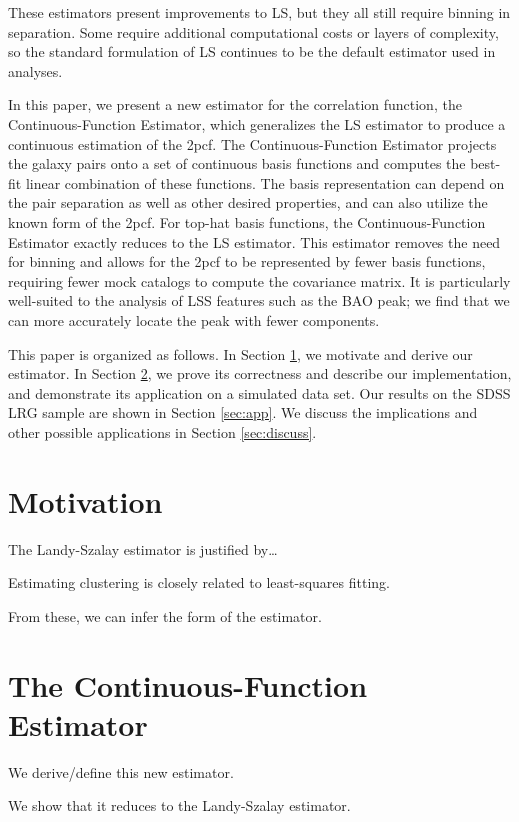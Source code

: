 \documentclass[twocolumn]{aastex62}
\newcommand{\cf}{2pcf\xspace} %
\newcommand{\Est}{The Continuous-Function Estimator\xspace}
\newcommand{\est}{the Continuous-Function Estimator\xspace}
\begin{document}
These estimators present improvements to LS, but they all still require binning in separation.
Some require additional computational costs or layers of complexity, so the standard formulation of LS continues to be the default estimator used in analyses.

In this paper, we present a new estimator for the correlation function, \est, which generalizes the LS estimator to produce a continuous estimation of the \cf. 
\Est projects the galaxy pairs onto a set of continuous basis functions and computes the best-fit linear combination of these functions.
The basis representation can depend on the pair separation as well as other desired properties, and can also utilize the known form of the \cf.
For top-hat basis functions, \est exactly reduces to the LS estimator. 
This estimator removes the need for binning and allows for the \cf to be represented by fewer basis functions, requiring fewer mock catalogs to compute the covariance matrix.
It is particularly well-suited to the analysis of LSS features such as the BAO peak; we find that we can more accurately locate the peak with fewer components.

This paper is organized as follows. In Section \ref{sec:motiv}, we motivate and derive our estimator. In Section \ref{sec:est}, we prove its correctness and describe our implementation, and demonstrate its application on a simulated data set. Our results on the SDSS LRG sample are shown in Section \ref{sec:app}. We discuss the implications and other possible applications in Section \ref{sec:discuss}. 

\section{Motivation} \label{sec:motiv}

The Landy-Szalay estimator is justified by\ldots

Estimating clustering is closely related to least-squares fitting.

From these, we can infer the form of the estimator.

\section{\Est} \label{sec:est}

We derive/define this new estimator.

We show that it reduces to the Landy-Szalay estimator.
\end{document}
